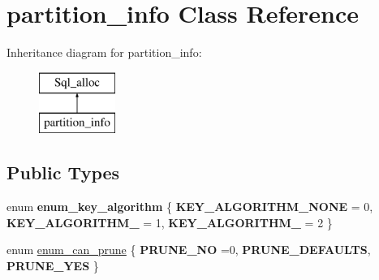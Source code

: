 \hypertarget{classpartition__info}{}\section{partition\+\_\+info Class Reference}
\label{classpartition__info}
Inheritance diagram for partition\+\_\+info\+:\begin{figure}[H]
\begin{center}
\leavevmode
\includegraphics[height=2.000000cm]{classpartition__info}
\end{center}
\end{figure}
\subsection*{Public Types}
\begin{DoxyCompactItemize}
\item 
\mbox{\label{classpartition__info_ad6fd69c98229fea111fc267bab9d62d9}} 
enum {\bfseries enum\+\_\+key\+\_\+algorithm} \{ {\bfseries K\+E\+Y\+\_\+\+A\+L\+G\+O\+R\+I\+T\+H\+M\+\_\+\+N\+O\+NE} = 0, 
{\bfseries K\+E\+Y\+\_\+\+A\+L\+G\+O\+R\+I\+T\+H\+M\+\_} = 1, 
{\bfseries K\+E\+Y\+\_\+\+A\+L\+G\+O\+R\+I\+T\+H\+M\+\_} = 2
 \}
\item 
enum \mbox{\hyperlink{classpartition__info_aaef02282065db06059d0d77a6d6096e9}{enum\+\_\+can\+\_\+prune}} \{ {\bfseries P\+R\+U\+N\+E\+\_\+\+NO} =0, 
{\bfseries P\+R\+U\+N\+E\+\_\+\+D\+E\+F\+A\+U\+L\+TS}, 
{\bfseries P\+R\+U\+N\+E\+\_\+\+Y\+ES}
 \}
\end{DoxyCompactItemize}
